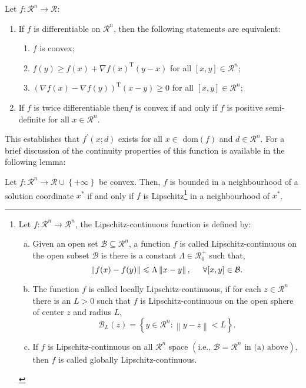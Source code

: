 \begin{thm}\label{Theorem_Convex3}
   Let $f:\mathcal{R}^{n}\rightarrow\mathcal{R}$:
     \begin{enumerate}
        \item If $f$ is differentiable on $\mathcal{R}^{n}$, then the following statements are equivalent:
             \begin{enumerate}
                 \item $f$ is convex;
                 \item $f(y)\ge f(x)+\nabla f(x)^{\text{T}}\left(y-x\right)$ for all $[x,y]\in\mathcal{R}^{n}$;
                 \item $\left(\nabla f(x)-\nabla f(y)\right)^{\text{T}}(x-y) \ge 0$ for all $[x,y]\in\mathcal{R}^{n}$;
             \end{enumerate}
        \item If $f$ is twice differentiable then$f$ is convex if and only if $f$ is positive semi-definite for all $x\in\mathcal{R}^{n}$.
     \end{enumerate}
\end{thm}

This establishes that $f^{\prime}\left(x;d\right)$ exists for all $x\in\text{ dom}(f)$ and $d\in\mathcal{R}^{n}$. For a brief discussion of the continuity properties of this function is available in the following lemma:
\begin{lem}
    Let $f:\mathcal{R}^{n}\rightarrow\mathcal{R}\cup\left\{+\infty\right\}$ be convex. Then, $f$ is bounded in a neighbourhood of a solution coordinate $x^{\ast}$ if and only if $f$ is Lipschitz\footnote{
Let $f:\mathcal{R}^{n}\rightarrow\mathcal{R}^{n}$, the Lipschitz-continuous function is defined by:
    \begin{enumerate}[(a)]
       \item Given an open set $\mathcal{B}\subseteq\mathcal{R}^{n}$, a function $f$ is called Lipschitz-continuous on the open subset $\mathcal{B}$ is there is a constant $\Lambda\in\mathcal{R}_{0}^{+}$ such that,
           \begin{displaymath}
               \left\|f(x)-f(y)\right\| \le  \Lambda\left\|x-y\right\|, \hspace{.5cm} \forall[x,y]\in\mathcal{B}.
           \end{displaymath}
       \item The function $f$ is called locally Lipschitz-continuous, if for each $z\in\mathcal{R}^{n}$ there is an $L>0$ such that $f$ is Lipschitz-continuous on the open sphere of center $z$ and radius $L$,
           \begin{displaymath}
              \mathcal{B}_{L}(z) = \left\{y\in\mathcal{R}^{n} :\left\|y-z\right\| < L\right\}.
           \end{displaymath}
       \item If $f$ is Lipschitz-continuous on all $\mathcal{R}^{n}$ space $\left(\text{i.e., }\mathcal{B}=\mathcal{R}^{n}\text{ in (a) above}\right)$, then $f$ is called globally Lipschitz-continuous.

    \end{enumerate}}
 in a neighbourhood of $x^{\ast}$.
\end{lem}

